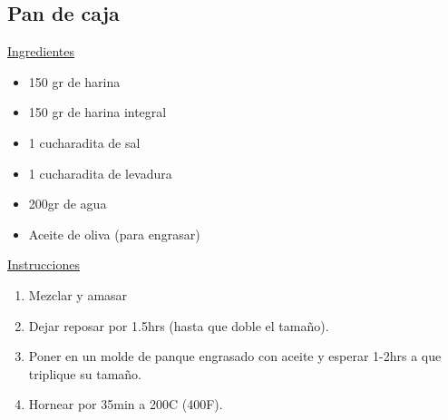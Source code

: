 \subsection{Pan de caja}

\underline{Ingredientes}

\begin{itemize}
\item 150 gr de harina
\item 150 gr de harina integral
\item 1 cucharadita de sal
\item 1 cucharadita de levadura
\item 200gr de agua
\item Aceite de oliva (para engrasar)
\end{itemize}

\underline{Instrucciones}

\begin{enumerate}
\item Mezclar y amasar
\item Dejar reposar por \Sim1.5hrs (hasta que doble el tamaño).
\item Poner en un molde de panque engrasado con aceite y esperar 1-2hrs a que triplique su tamaño.
\item Hornear por \Sim35min a 200C (400F).
\end{enumerate}
